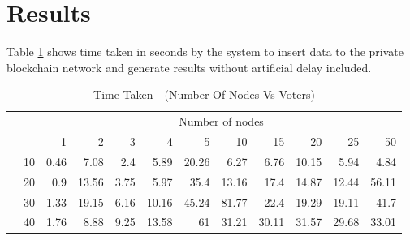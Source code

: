\documentclass[10pt,final,journal,a4paper,oneside,twocolumn]{IEEEtran}
\begin{document}
	\section{Results}
		Table \ref{tab:result-table} shows time taken in seconds by the system to insert data to the private blockchain network and generate results without artificial delay included.
		\begin{table}
			\centering
			\caption{Time Taken - (Number Of Nodes Vs Voters)}
			\label{tab:result-table}
			\begin{tabular}{|cr|rrrrrrrrrr|}
				\hline
				\multicolumn{2}{|c|}{\multirow{2}{*}{}}       & \multicolumn{10}{c|}{Number of nodes}                                                                                                                                                                                                                                              \\ \cline{3-12} 
				\multicolumn{2}{|c|}{}                        & \multicolumn{1}{r|}{1}     & \multicolumn{1}{r|}{2}      & \multicolumn{1}{r|}{3}     & \multicolumn{1}{r|}{4}      & \multicolumn{1}{r|}{5}      & \multicolumn{1}{r|}{10}     & \multicolumn{1}{r|}{15}     & \multicolumn{1}{r|}{20}     & \multicolumn{1}{r|}{25}     & 50     \\ \hline
				\multicolumn{1}{|c|}{\multirow{4}{*}{}} & 10  & \multicolumn{1}{r|}{0.46}  & \multicolumn{1}{r|}{7.08}   & \multicolumn{1}{r|}{2.4}   & \multicolumn{1}{r|}{5.89}   & \multicolumn{1}{r|}{20.26}  & \multicolumn{1}{r|}{6.27}   & \multicolumn{1}{r|}{6.76}   & \multicolumn{1}{r|}{10.15}  & \multicolumn{1}{r|}{5.94}   & 4.84   \\ \cline{2-12} 
				\multicolumn{1}{|c|}{}                  & 20  & \multicolumn{1}{r|}{0.9}   & \multicolumn{1}{r|}{13.56}  & \multicolumn{1}{r|}{3.75}  & \multicolumn{1}{r|}{5.97}   & \multicolumn{1}{r|}{35.4}   & \multicolumn{1}{r|}{13.16}  & \multicolumn{1}{r|}{17.4}   & \multicolumn{1}{r|}{14.87}  & \multicolumn{1}{r|}{12.44}  & 56.11  \\ \cline{2-12} 
				\multicolumn{1}{|c|}{}                  & 30  & \multicolumn{1}{r|}{1.33}  & \multicolumn{1}{r|}{19.15}  & \multicolumn{1}{r|}{6.16}  & \multicolumn{1}{r|}{10.16}  & \multicolumn{1}{r|}{45.24}  & \multicolumn{1}{r|}{81.77}  & \multicolumn{1}{r|}{22.4}   & \multicolumn{1}{r|}{19.29}  & \multicolumn{1}{r|}{19.11}  & 41.7   \\ \cline{2-12} 
				\multicolumn{1}{|c|}{}                  & 40  & \multicolumn{1}{r|}{1.76}  & \multicolumn{1}{r|}{8.88}   & \multicolumn{1}{r|}{9.25}  & \multicolumn{1}{r|}{13.58}  & \multicolumn{1}{r|}{61}     & \multicolumn{1}{r|}{31.21}  & \multicolumn{1}{r|}{30.11}  & \multicolumn{1}{r|}{31.57}  & \multicolumn{1}{r|}{29.68}  & 33.01  \\ \cline{2-12} 

\end{tabular}
\end{table}
\end{document}

